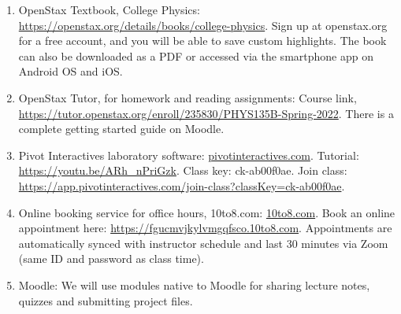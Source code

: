 \documentclass[10pt]{article}
\begin{document}
\begin{enumerate}
\item OpenStax Textbook, College Physics: \url{https://openstax.org/details/books/college-physics}.  Sign up at openstax.org for a free account, and you will be able to save custom highlights.  The book can also be downloaded as a PDF or accessed via the smartphone app on Android OS and iOS.
\item OpenStax Tutor, for homework and reading assignments: Course link, \url{https://tutor.openstax.org/enroll/235830/PHYS135B-Spring-2022}.  There is a complete getting started guide on Moodle.
\item Pivot Interactives laboratory software: \url{pivotinteractives.com}. Tutorial: \url{https://youtu.be/ARh_nPriGzk}.  Class key: ck-ab00f0ae.  Join class: \url{https://app.pivotinteractives.com/join-class?classKey=ck-ab00f0ae}.
\item Online booking service for office hours, 10to8.com: \url{10to8.com}.  Book an online appointment here: \url{https://fgucmvjkylvmgqfsco.10to8.com}.  Appointments are automatically synced with instructor schedule and last 30 minutes via Zoom (same ID and password as class time).
\item Moodle: We will use modules native to Moodle for sharing lecture notes, quizzes and submitting project files. 
\end{enumerate}
\end{document}
